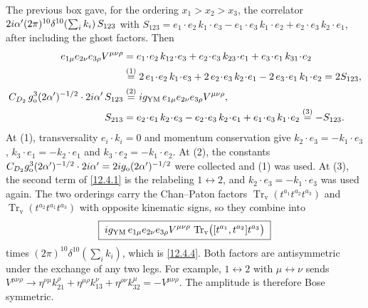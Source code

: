 \begin{tcolorbox}[breakable]
\begin{remark}
		The previous box gave, for the ordering $x_{1}>x_{2}>x_{3}$, the correlator $2i\alpha'(2\pi)^{10}\delta^{10}(\sum_i k_{i})\,S_{123}$ with $S_{123}=e_{1}\!\cdot\! e_{2}\,k_{1}\!\cdot\! e_{3}-e_{1}\!\cdot\! e_{3}\,k_{1}\!\cdot\! e_{2}+e_{2}\!\cdot\! e_{3}\,k_{2}\!\cdot\! e_{1}$, after including the ghost factors. Then
		\begin{align*}
			e_{1\mu}e_{2\nu}e_{3\rho}V^{\mu\nu\rho}
			&=e_{1}\!\cdot\! e_{2}\,k_{12}\!\cdot\! e_{3}+e_{2}\!\cdot\! e_{3}\,k_{23}\!\cdot\! e_{1}+e_{3}\!\cdot\! e_{1}\,k_{31}\!\cdot\! e_{2}\\
			&\eqs{1} 2\,e_{1}\!\cdot\! e_{2}\,k_{1}\!\cdot\! e_{3}+2\,e_{2}\!\cdot\! e_{3}\,k_{2}\!\cdot\! e_{1}-2\,e_{3}\!\cdot\! e_{1}\,k_{1}\!\cdot\! e_{2}=2S_{123} ,\\
			C_{D_2}\,g_{\mathrm{o}}^{3}(2\alpha')^{-1/2}\cdot 2\mi\alpha'\,S_{123}
			&\eqs{2} \mi g_{\mathrm{YM}}\,e_{1\mu}e_{2\nu}e_{3\rho}V^{\mu\nu\rho} ,\\
			S_{213}&=e_{2}\!\cdot\! e_{1}\,k_{2}\!\cdot\! e_{3}-e_{2}\!\cdot\! e_{3}\,k_{2}\!\cdot\! e_{1}+e_{1}\!\cdot\! e_{3}\,k_{1}\!\cdot\! e_{2}
			\eqs{3} -S_{123} .
		\end{align*}
		At (1), transversality $e_{i}\cdot k_{i}=0$ and momentum conservation give $k_{2}\cdot e_{3}=-k_{1}\cdot e_{3}$, $k_{3}\cdot e_{1}=-k_{2}\cdot e_{1}$ and $k_{3}\cdot e_{2}=-k_{1}\cdot e_{2}$. At (2), the constants $C_{D_2}g_{\mathrm{o}}^{3}(2\alpha')^{-1/2}\cdot 2i\alpha'=2i g_{\mathrm{o}}(2\alpha')^{-1/2}$ were collected and (1) was used. At (3), the second term of \eqref{12.4.1} is the relabeling $1\leftrightarrow2$, and $k_{2}\cdot e_{3}=-k_{1}\cdot e_{3}$ was used again. The two orderings carry the Chan--Paton factors $\operatorname{Tr}_{\mathrm{v}}(t^{a_1}t^{a_2}t^{a_3})$ and $\operatorname{Tr}_{\mathrm{v}}(t^{a_2}t^{a_1}t^{a_3})$ with opposite kinematic signs, so they combine into
		\[
		\boxed{\;i g_{\mathrm{YM}}\,e_{1\mu}e_{2\nu}e_{3\rho}V^{\mu\nu\rho}\,\operatorname{Tr}_{\mathrm{v}}\bigl([t^{a_1},t^{a_2}]t^{a_3}\bigr)\;}
		\]
		times $(2\pi)^{10}\delta^{10}(\sum_i k_{i})$, which is \eqref{12.4.4}. Both factors are antisymmetric under the exchange of any two legs. For example, $1\leftrightarrow2$ with $\mu\leftrightarrow\nu$ sends $V^{\mu\nu\rho}\to\eta^{\nu\mu}k_{21}^{\rho}+\eta^{\mu\rho}k_{13}^{\nu}+\eta^{\rho\nu}k_{32}^{\mu}=-V^{\mu\nu\rho}$. The amplitude is therefore Bose symmetric.
	\end{remark}
\end{tcolorbox}

